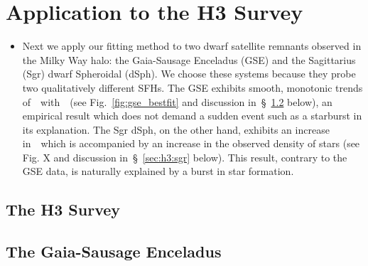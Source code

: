 \documentclass[ms.tex]{subfiles}
\begin{document}
\section{Application to the H3 Survey}
\label{sec:h3}

\begin{itemize}

	\item Next we apply our fitting method to two dwarf satellite remnants
	observed in the Milky Way halo: the Gaia-Sausage Enceladus (GSE) and the
	Sagittarius (Sgr) dwarf Spheroidal (dSph).
	We choose these systems because they probe two qualitatively different SFHs.
	The GSE exhibits smooth, monotonic trends of~\afe~with~\feh~(see
	Fig.~\ref{fig:gse_bestfit} and discussion in~\S~\ref{sec:h3:gse} below),
	an empirical result which does not demand a sudden event such as a
	starburst in its explanation.
	The Sgr dSph, on the other hand, exhibits an increase in~\afe~which is
	accompanied by an increase in the observed density of stars (see
	Fig. X and discussion in~\S~\ref{sec:h3:sgr} below).
	This result, contrary to the GSE data, is naturally explained by a burst in
	star formation.

\end{itemize}

\subsection{The H3 Survey}
\label{sec:h3:survey}

\subsection{The Gaia-Sausage Enceladus}
\label{sec:h3:gse}
\end{document}
